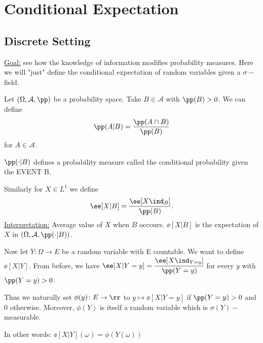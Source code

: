 \documentclass[../main.tex]{subfiles}
\begin{document}
\section{Conditional Expectation}
\subsection{Discrete Setting}
\underline{Goal:} see how the knowledge of information modifies probability
measures. Here we will "just" define the conditional expectation of random
variables given a $\sigma-$field.

\vspace{0.5em}
\noindent
Let $(\Omega, \mathcal{A}, \pp)$ be a probability space. Take $B \in
\mathcal{A}$ with $\pp(B) > 0$. We can define
\[
  \pp(A | B) = \frac{\pp(A \cap B)}{\pp(B)} 
\]
for $A \in \mathcal{A}$. 

\vspace{0.5em}
\noindent
$\pp(\cdot \vert B)$ defines a probability measure called the conditional
probability given the EVENT B.

\vspace{0.5em}
\noindent
Similarly for $X \in L^1$ we define 
\[
  \ee[X | B] = \frac{\ee[X \ind_{B}]}{\pp(B)} 
.\] 
\underline{Interpretation:} Average value of $X$ when $B$ occours. $\ee[X | B]$
is the expectation of $X$ in $(\Omega, \mathcal{A}, \pp(\cdot | B))$.

\vspace{1em}
\noindent
Now let $Y \colon \Omega \to E$ be a random variable with E countable. We want
to define $\ee[X | Y]$. From before, we have $\ee[X | Y = y] = \cfrac{\ee[X \ind_{Y =
y}]}{\pp(Y = y)}$ for every $y$ with $\pp(Y = y) > 0$. 

\vspace{0.5em}
\noindent
Thus we naturally set $\phi(y) \colon E \to \rr$ to $y \mapsto \ee[X | Y = y]$
if $\pp(Y = y) > 0$ and $0$ otherwise. Moreover, $\phi(Y)$ is itself a random
variable which is $\sigma(Y)-$measurable.

\vspace{0.3em}\noindent
In other words: $\ee[X | Y] (\omega) = \phi(Y(\omega))$
\end{document}
